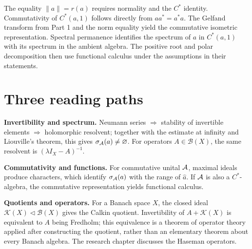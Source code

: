 \begin{center}
\end{center}

The equality $\|a\|=r(a)$ requires normality and the $C^*$ identity.
Commutativity of $C^*(a,1)$ follows directly from $aa^*=a^*a$.
The Gelfand transform from Part 1 and the norm equality yield the
commutative isometric representation. Spectral permanence identifies the spectrum
of $a$ in $C^*(a,1)$ with its spectrum in the ambient algebra. The positive root and
polar decomposition then use functional calculus under the assumptions in their statements.

\section{Three reading paths}

\noindent\textbf{Invertibility and spectrum.} Neumann series $\Rightarrow$ stability of invertible
elements $\Rightarrow$ holomorphic resolvent; together with the estimate at infinity and
Liouville's theorem, this gives $\sigma_{\mathcal A}(a)\neq\varnothing$. For operators
$A\in\mathcal B(X)$, the same resolvent is $(\lambda I_X-A)^{-1}$.

\noindent\textbf{Commutativity and functions.} For commutative unital $\mathcal A$, maximal ideals
produce characters, which identify $\sigma_{\mathcal A}(a)$ with the range of $\widehat a$.
If $\mathcal A$ is also a $C^*$-algebra, the commutative representation yields functional calculus.

\noindent\textbf{Quotients and operators.} For a Banach space $X$, the closed ideal
$\mathcal K(X)\triangleleft\mathcal B(X)$ gives the Calkin quotient. Invertibility of
$A+\mathcal K(X)$ is equivalent to $A$ being Fredholm; this equivalence is a theorem of
operator theory applied after constructing the quotient, rather than an elementary theorem
about every Banach algebra. The research chapter discusses the Haseman operators.
